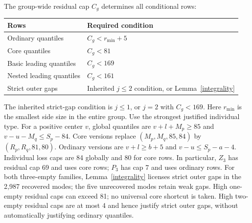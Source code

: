 \documentclass[11pt,a4paper]{article}
\begin{document}
The group-wide residual cap $C_g$ determines all conditional rows:
\begin{center}\small
\begin{tabular}{ll}\toprule
Rows&Required condition\\\midrule
Ordinary quantiles&$C_g<r_{\min}+5$\\
Core quantiles&$C_g<81$\\
Basic leading quantiles&$C_g<169$\\
Nested leading quantiles&$C_g<161$\\
Strict outer gaps&Inherited $j\le2$ condition, or Lemma~\ref{integrality}\\\bottomrule
\end{tabular}
\end{center}
The inherited strict-gap condition is $j\le1$, or $j=2$ with
$C_g<169$. Here $r_{\min}$ is the smallest side size in the entire group. Use the
strongest justified individual type. For a positive center $v$, global
quantiles are $v+l+M_p\ge85$ and $v-u-M_q\le S_p-84$.
Core versions replace $(M_p,M_q,85,84)$ by $(R_p,R_q,81,80)$.
Ordinary versions are $v+l\ge b+5$ and $v-u\le S_p-a-4$.
Individual loss caps are 84 globally and 80 for core rows.
In particular, $Z_3$ has residual cap 69 and uses core rows;
$P_3$ has cap 7 and uses ordinary rows. For both three-empty families,
Lemma~\ref{integrality} licenses strict outer gaps in the 2,987 recovered
modes; the five unrecovered modes retain weak gaps.
High one-empty residual caps can exceed 81; no universal core shortcut
is taken. High two-empty residual caps are at most 4 and hence justify
strict outer gaps, without automatically justifying ordinary quantiles.
\end{document}
